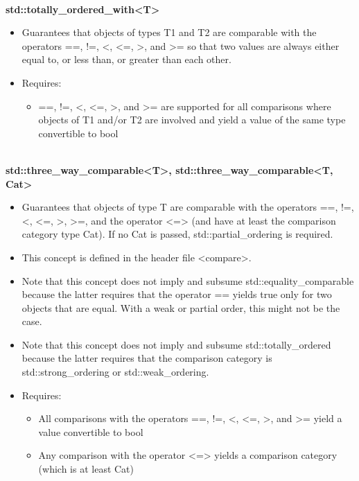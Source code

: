 \noindent
\hspace*{\fill} \\ %
\textbf{std::totally\_ordered\_with<T>}

\begin{itemize}
\item
Guarantees that objects of types T1 and T2 are comparable with the operators ==, !=, <, <=, >, and >= so that two values are always either equal to, or less than, or greater than each other.

\item
Requires:
\begin{itemize}
\item
==, !=, <, <=, >, and >= are supported for all comparisons where objects of T1 and/or T2 are involved and yield a value of the same type convertible to bool
\end{itemize}
\end{itemize}


\noindent
\hspace*{\fill} \\ %
\textbf{std::three\_way\_comparable<T>, std::three\_way\_comparable<T, Cat>}


\begin{itemize}
\item
Guarantees that objects of type T are comparable with the operators ==, !=, <, <=, >, >=, and the operator <=> (and have at least the comparison category type Cat). If no Cat is passed, std::partial\_ordering is required.

\item
This concept is defined in the header file <compare>.

\item
Note that this concept does not imply and subsume std::equality\_comparable because the latter requires that the operator == yields true only for two objects that are equal. With a weak or partial order, this might not be the case.

\item
Note that this concept does not imply and subsume std::totally\_ordered because the latter requires that the comparison category is std::strong\_ordering or std::weak\_ordering.

\item
Requires:
\begin{itemize}
\item
All comparisons with the operators ==, !=, <, <=, >, and >= yield a value convertible to bool

\item
Any comparison with the operator <=> yields a comparison category (which is at least Cat)
\end{itemize}
\end{itemize}

